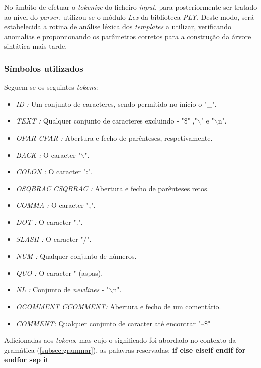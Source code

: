 \documentclass[../relatorio.tex]{subfiles}
\begin{document}
    No âmbito de efetuar o \textit{tokenize} do ficheiro \textit{input},
    para posteriormente ser tratado ao nível do \textit{parser}, 
    utilizou-se o módulo \textit{Lex} da biblioteca \textit{PLY}.
    Deste modo, será estabelecida a rotina de análise léxica 
    dos \textit{templates} a utilizar, verificando anomalias e
    proporcionando os parâmetros corretos para a construção da árvore 
    sintática mais tarde.

    \subsubsection{Símbolos utilizados}

    Seguem-se os seguintes \textit{tokens}:
    \begin{itemize}
        \item \textit{ID :} Um conjunto de caracteres, sendo permitido no ínicio o "\_".
        \item \textit{TEXT :} Qualquer conjunto de caracteres excluindo - "\$" ,"$\backslash$" e "$\backslash$n".
        \item \textit{OPAR CPAR :} Abertura e fecho de parênteses, respetivamente.
        \item \textit{BACK :} O caracter "$\backslash$".
        \item \textit{COLON :} O caracter ":".
        \item \textit{OSQBRAC CSQBRAC :} Abertura e fecho de parênteses retos.
        \item \textit{COMMA :} O caracter ",".
        \item \textit{DOT :} O caracter ".".
        \item \textit{SLASH :} O caracter "/".
        \item \textit{NUM :} Qualquer conjunto de números.
        \item \textit{QUO :} O caracter " (aspas).
        \item \textit{NL :} Conjunto de \textit{newlines} - "$\backslash$n".
        \item \textit{OCOMMENT CCOMMENT: } Abertura e fecho de um comentário.
        \item \textit{COMMENT: } Qualquer conjunto de caracter até encontrar "--\$"
    \end{itemize}

    Adicionadas aos \textit{tokens}, mas cujo o significado foi abordado
    no contexto da gramática (\ref{subsec:grammar}), as palavras reservadas:
        \textbf{if else elseif endif for endfor sep it}
\end{document}
